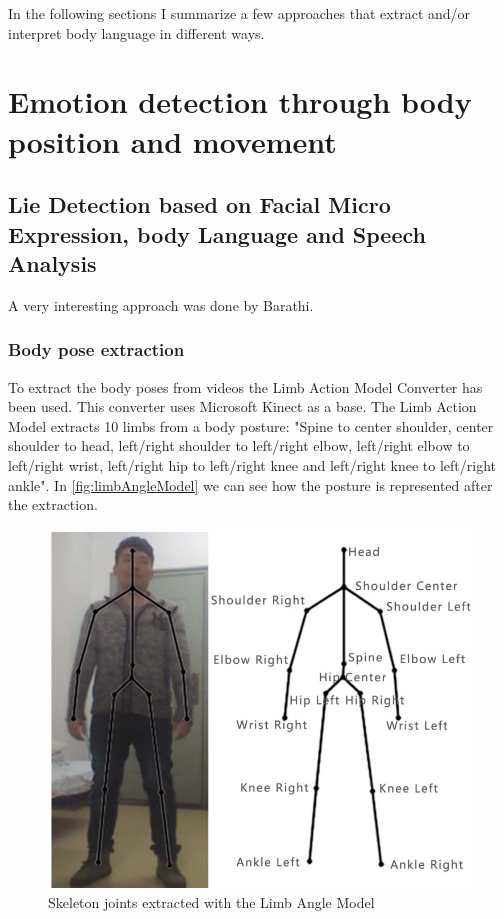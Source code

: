 \documentclass[conference]{IEEEtran}
\begin{document}
In the following sections I summarize a few approaches that extract and/or interpret body language in different ways. 


\section{Emotion detection through body position and movement}
\label{sec:emotionBodyMovementPos}
\subsection{Lie Detection based on Facial Micro Expression, body Language and Speech Analysis}
\label{subsec:lieDetectionLAM}
A very interesting approach was done by Barathi\cite{barathi2016lie}. 
\subsubsection{Body pose extraction}
To extract the body poses from videos the Limb Action Model Converter\cite{du20143d} has been used. This converter uses Microsoft Kinect as a base. 
The Limb Action Model extracts 10 limbs from a body posture: "Spine to center shoulder, center shoulder to head, left/right shoulder to left/right elbow, left/right elbow to left/right wrist, left/right hip to left/right knee and left/right knee to left/right ankle"\cite{du20143d}. In \autoref{fig:limbAngleModel} we can see how the posture is represented after the extraction.

\begin{figure}[H]
\centering
\includegraphics[width=\linewidth]{limbAngleModel.jpg}
\caption{Skeleton joints extracted with the Limb Angle Model\cite{du20143d}}
\label{fig:limbAngleModel}
\end{figure}
\end{document}
